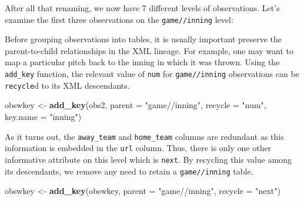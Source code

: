 \documentclass[12pt,]{isuthesis}
\newenvironment{Shaded}{\begin{snugshade}}{\end{snugshade}}
\newcommand{\KeywordTok}[1]{\textcolor[rgb]{0.13,0.29,0.53}{\textbf{{#1}}}}
\newcommand{\DataTypeTok}[1]{\textcolor[rgb]{0.13,0.29,0.53}{{#1}}}
\newcommand{\DecValTok}[1]{\textcolor[rgb]{0.00,0.00,0.81}{{#1}}}
\newcommand{\StringTok}[1]{\textcolor[rgb]{0.31,0.60,0.02}{{#1}}}
\newcommand{\CommentTok}[1]{\textcolor[rgb]{0.56,0.35,0.01}{\textit{{#1}}}}
\newcommand{\NormalTok}[1]{{#1}}
\begin{document}
After all that renaming, we now have 7 different levels of observations.
Let's examine the first three observations on the \texttt{game//inning}
level:

\begin{Shaded}
\end{Shaded}

Before grouping observations into tables, it is usually important
preserve the parent-to-child relationships in the XML lineage. For
example, one may want to map a particular pitch back to the inning in
which it was thrown. Using the \texttt{add\_key} function, the relevant
value of \texttt{num} for \texttt{game//inning} observations can be
\texttt{recycle}d to its XML descendants.

\begin{Shaded}
\begin{Highlighting}[]
\NormalTok{obswkey <-}\StringTok{ }\KeywordTok{add_key}\NormalTok{(obs2, }\DataTypeTok{parent =} \StringTok{"game//inning"}\NormalTok{, }\DataTypeTok{recycle =} \StringTok{"num"}\NormalTok{, }\DataTypeTok{key.name =} \StringTok{"inning"}\NormalTok{)}
\end{Highlighting}
\end{Shaded}

As it turns out, the \texttt{away\_team} and \texttt{home\_team} columns
are redundant as this information is embedded in the \texttt{url}
column. Thus, there is only one other informative attribute on this
level which is \texttt{next}. By recycling this value among its
descendants, we remove any need to retain a \texttt{game//inning} table.

\begin{Shaded}
\begin{Highlighting}[]
\NormalTok{obswkey <-}\StringTok{ }\KeywordTok{add_key}\NormalTok{(obswkey, }\DataTypeTok{parent =} \StringTok{"game//inning"}\NormalTok{, }\DataTypeTok{recycle =} \StringTok{"next"}\NormalTok{)}
\end{Highlighting}
\end{Shaded}
\end{document}
